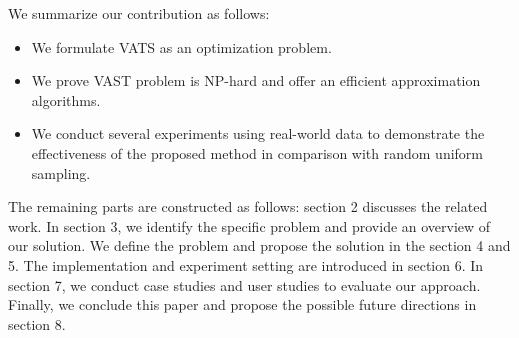 We summarize our contribution as follows:
\begin{itemize}[noitemsep]
  \item We formulate VATS as an optimization problem.
  \item We prove VAST problem is NP-hard and offer an efficient approximation algorithms. 
  \item We conduct several experiments using real-world data to demonstrate the effectiveness of the proposed method in comparison with random uniform sampling.
\end{itemize}


The remaining parts are constructed as follows: section 2 discusses the related work. In section 3, we identify the specific problem and provide an overview of our solution. We define the problem and propose the solution in the section 4 and 5. The implementation and experiment setting are introduced in section 6. 
In section 7, we conduct case studies and user studies to evaluate our approach. Finally, we conclude this paper and propose the possible future directions in section 8.
